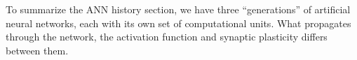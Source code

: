 To summarize the ANN history section,  we have three ``generations'' of artificial neural networks, each with its own set of computational units. %
What propagates through the network, the activation function and synaptic plasticity differs between them. 

